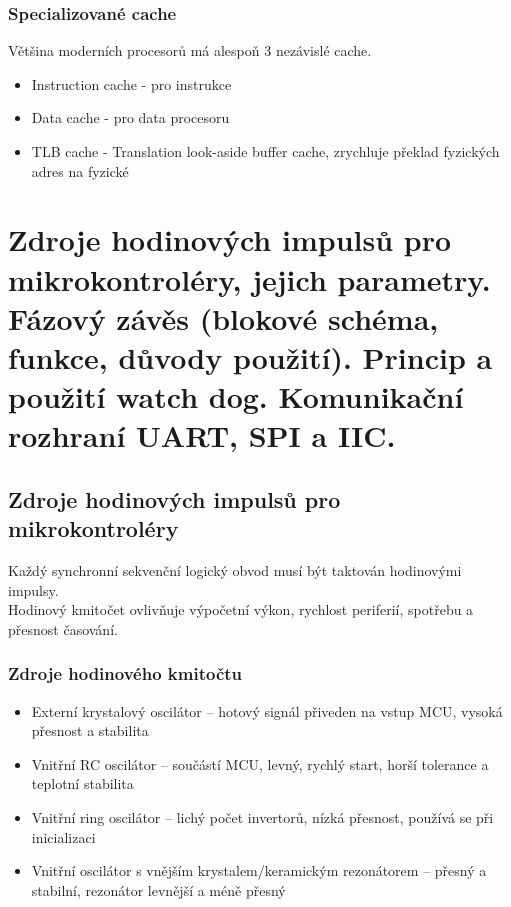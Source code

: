 \subsubsection*{Specializované cache}
Většina moderních procesorů má alespoň 3 nezávislé cache.\\
\begin{itemize}
    \item Instruction cache - pro instrukce
    \item Data cache - pro data procesoru
    \item TLB cache - Translation look-aside buffer cache, zrychluje překlad fyzických adres na fyzické
\end{itemize}

\section{Zdroje hodinových impulsů pro mikrokontroléry, jejich parametry. Fázový závěs (blokové schéma, funkce, důvody použití). Princip a použití watch dog. Komunikační rozhraní UART, SPI a IIC.}

\subsection{Zdroje hodinových impulsů pro mikrokontroléry}
Každý synchronní sekvenční logický obvod musí být taktován hodinovými impulsy.\\
Hodinový kmitočet ovlivňuje výpočetní výkon, rychlost periferií, spotřebu a přesnost časování.\\

\subsubsection*{Zdroje hodinového kmitočtu}
\begin{itemize}
    \item Externí krystalový oscilátor – hotový signál přiveden na vstup MCU, vysoká přesnost a stabilita
    \item Vnitřní RC oscilátor – součástí MCU, levný, rychlý start, horší tolerance a teplotní stabilita
    \item Vnitřní ring oscilátor – lichý počet invertorů, nízká přesnost, používá se při inicializaci
    \item Vnitřní oscilátor s vnějším krystalem/keramickým rezonátorem – přesný a stabilní, rezonátor levnější a méně přesný
\end{itemize}

